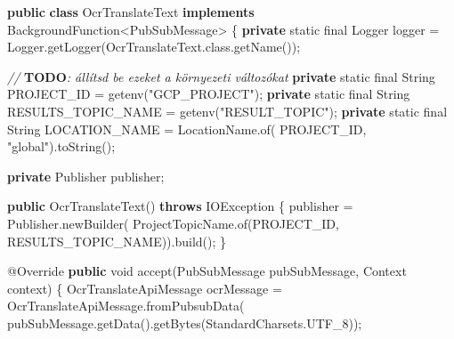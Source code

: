 \documentclass[
]{article}
\newenvironment{Shaded}{}{}
\newcommand{\AlertTok}[1]{\textcolor[rgb]{1.00,0.00,0.00}{\textbf{#1}}}
\newcommand{\AttributeTok}[1]{\textcolor[rgb]{0.49,0.56,0.16}{#1}}
\newcommand{\BuiltInTok}[1]{\textcolor[rgb]{0.00,0.50,0.00}{#1}}
\newcommand{\CommentTok}[1]{\textcolor[rgb]{0.38,0.63,0.69}{\textit{#1}}}
\newcommand{\DataTypeTok}[1]{\textcolor[rgb]{0.56,0.13,0.00}{#1}}
\newcommand{\FunctionTok}[1]{\textcolor[rgb]{0.02,0.16,0.49}{#1}}
\newcommand{\KeywordTok}[1]{\textcolor[rgb]{0.00,0.44,0.13}{\textbf{#1}}}
\newcommand{\NormalTok}[1]{#1}
\newcommand{\OperatorTok}[1]{\textcolor[rgb]{0.40,0.40,0.40}{#1}}
\newcommand{\StringTok}[1]{\textcolor[rgb]{0.25,0.44,0.63}{#1}}
\begin{document}
\begin{Shaded}
\begin{Highlighting}[]
\KeywordTok{public} \KeywordTok{class}\NormalTok{ OcrTranslateText }\KeywordTok{implements}\NormalTok{ BackgroundFunction}\OperatorTok{\textless{}}\NormalTok{PubSubMessage}\OperatorTok{\textgreater{}} \OperatorTok{\{}
  \KeywordTok{private} \DataTypeTok{static} \DataTypeTok{final} \BuiltInTok{Logger}\NormalTok{ logger }\OperatorTok{=} \BuiltInTok{Logger}\OperatorTok{.}\FunctionTok{getLogger}\OperatorTok{(}\NormalTok{OcrTranslateText}\OperatorTok{.}\FunctionTok{class}\OperatorTok{.}\FunctionTok{getName}\OperatorTok{());}

  \CommentTok{// }\AlertTok{TODO}\CommentTok{: állítsd be ezeket a környezeti változókat}
  \KeywordTok{private} \DataTypeTok{static} \DataTypeTok{final} \BuiltInTok{String}\NormalTok{ PROJECT\_ID }\OperatorTok{=} \FunctionTok{getenv}\OperatorTok{(}\StringTok{"GCP\_PROJECT"}\OperatorTok{);}
  \KeywordTok{private} \DataTypeTok{static} \DataTypeTok{final} \BuiltInTok{String}\NormalTok{ RESULTS\_TOPIC\_NAME }\OperatorTok{=} \FunctionTok{getenv}\OperatorTok{(}\StringTok{"RESULT\_TOPIC"}\OperatorTok{);}
  \KeywordTok{private} \DataTypeTok{static} \DataTypeTok{final} \BuiltInTok{String}\NormalTok{ LOCATION\_NAME }\OperatorTok{=}\NormalTok{ LocationName}\OperatorTok{.}\FunctionTok{of}\OperatorTok{(}
\NormalTok{      PROJECT\_ID}\OperatorTok{,} \StringTok{"global"}\OperatorTok{).}\FunctionTok{toString}\OperatorTok{();}

  \KeywordTok{private}\NormalTok{ Publisher publisher}\OperatorTok{;}

  \KeywordTok{public} \FunctionTok{OcrTranslateText}\OperatorTok{()} \KeywordTok{throws} \BuiltInTok{IOException} \OperatorTok{\{}
\NormalTok{    publisher }\OperatorTok{=}\NormalTok{ Publisher}\OperatorTok{.}\FunctionTok{newBuilder}\OperatorTok{(}
\NormalTok{        ProjectTopicName}\OperatorTok{.}\FunctionTok{of}\OperatorTok{(}\NormalTok{PROJECT\_ID}\OperatorTok{,}\NormalTok{ RESULTS\_TOPIC\_NAME}\OperatorTok{)).}\FunctionTok{build}\OperatorTok{();}
  \OperatorTok{\}}

  \AttributeTok{@Override}
  \KeywordTok{public} \DataTypeTok{void} \FunctionTok{accept}\OperatorTok{(}\NormalTok{PubSubMessage pubSubMessage}\OperatorTok{,} \BuiltInTok{Context}\NormalTok{ context}\OperatorTok{)} \OperatorTok{\{}
\NormalTok{    OcrTranslateApiMessage ocrMessage }\OperatorTok{=}\NormalTok{ OcrTranslateApiMessage}\OperatorTok{.}\FunctionTok{fromPubsubData}\OperatorTok{(}
\NormalTok{        pubSubMessage}\OperatorTok{.}\FunctionTok{getData}\OperatorTok{().}\FunctionTok{getBytes}\OperatorTok{(}\NormalTok{StandardCharsets}\OperatorTok{.}\FunctionTok{UTF\_8}\OperatorTok{));}


\end{Highlighting}
\end{Shaded}
\end{document}
